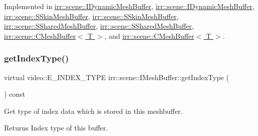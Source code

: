 Implemented in \hyperlink{classirr_1_1scene_1_1IDynamicMeshBuffer_a3ac73aed8c40103682c5c6388339e70d}{irr\+::scene\+::\+I\+Dynamic\+Mesh\+Buffer}, \hyperlink{classirr_1_1scene_1_1IDynamicMeshBuffer_a3ac73aed8c40103682c5c6388339e70d}{irr\+::scene\+::\+I\+Dynamic\+Mesh\+Buffer}, \hyperlink{structirr_1_1scene_1_1SSkinMeshBuffer_a0655e2196cb283a164580ada6c34aecf}{irr\+::scene\+::\+S\+Skin\+Mesh\+Buffer}, \hyperlink{structirr_1_1scene_1_1SSkinMeshBuffer_a0655e2196cb283a164580ada6c34aecf}{irr\+::scene\+::\+S\+Skin\+Mesh\+Buffer}, \hyperlink{structirr_1_1scene_1_1SSharedMeshBuffer_af9d02a1f61c5498cbe21be8185d1c803}{irr\+::scene\+::\+S\+Shared\+Mesh\+Buffer}, \hyperlink{structirr_1_1scene_1_1SSharedMeshBuffer_af9d02a1f61c5498cbe21be8185d1c803}{irr\+::scene\+::\+S\+Shared\+Mesh\+Buffer}, \hyperlink{classirr_1_1scene_1_1CMeshBuffer_aa183491690fa47b4697bbfcc7902301c}{irr\+::scene\+::\+C\+Mesh\+Buffer$<$ T $>$}, and \hyperlink{classirr_1_1scene_1_1CMeshBuffer_aa183491690fa47b4697bbfcc7902301c}{irr\+::scene\+::\+C\+Mesh\+Buffer$<$ T $>$}.

\mbox{\label{classirr_1_1scene_1_1IMeshBuffer_a8a993431c2c35420b62a577dc18dbdc2}} 
\subsubsection{\texorpdfstring{get\+Index\+Type()}{getIndexType()}\hspace{0.1cm}{\footnotesize\ttfamily [2/2]}}
{\footnotesize\ttfamily virtual video\+::\+E\+\_\+\+I\+N\+D\+E\+X\+\_\+\+T\+Y\+PE irr\+::scene\+::\+I\+Mesh\+Buffer\+::get\+Index\+Type (\begin{DoxyParamCaption}{ }\end{DoxyParamCaption}) const\hspace{0.3cm}{\ttfamily [pure virtual]}}



Get type of index data which is stored in this meshbuffer. 

\begin{DoxyReturn}{Returns}
Index type of this buffer. 
\end{DoxyReturn}


